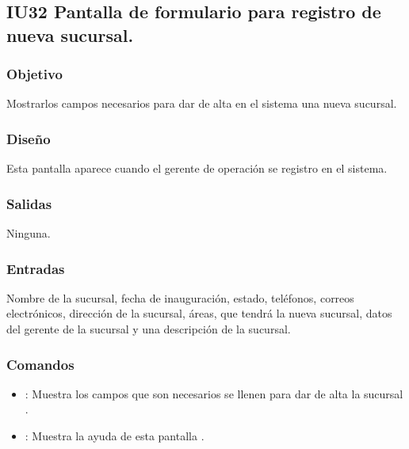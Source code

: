 	

\subsection{IU32 Pantalla de formulario para registro de nueva sucursal.}

\subsubsection{Objetivo}
	Mostrarlos campos necesarios para dar de alta en el sistema una nueva sucursal.

\subsubsection{Diseño}
	Esta pantalla aparece cuando el gerente de operación se registro en el sistema.


\subsubsection{Salidas}

	Ninguna.

\subsubsection{Entradas}
	Nombre de la sucursal, fecha de inauguración, estado, teléfonos, correos electrónicos, dirección de la sucursal, áreas, que tendrá la nueva sucursal, datos del gerente de la sucursal y una descripción de la sucursal.

\subsubsection{Comandos}
\begin{itemize}
	\item {}: Muestra los campos que son necesarios se llenen para dar de alta la sucursal .
	\item {}: Muestra la ayuda de esta pantalla .
\end{itemize}

